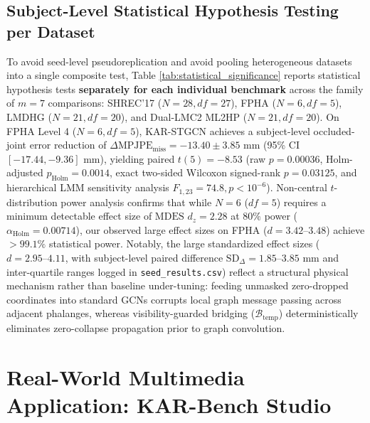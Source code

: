\documentclass[10pt,twocolumn]{article}
\begin{document}
\subsection{Subject-Level Statistical Hypothesis Testing per Dataset}
To avoid seed-level pseudoreplication and avoid pooling heterogeneous datasets into a single composite test, Table \ref{tab:statistical_significance} reports statistical hypothesis tests \textbf{separately for each individual benchmark} across the family of $m=7$ comparisons: SHREC'17 ($N=28, df=27$), FPHA ($N=6, df=5$), LMDHG ($N=21, df=20$), and Dual-LMC2 ML2HP ($N=21, df=20$). On FPHA Level 4 ($N=6, df=5$), KAR-STGCN achieves a subject-level occluded-joint error reduction of $\Delta\text{MPJPE}_{\text{miss}} = -13.40 \pm 3.85\text{ mm}$ (95\% CI $[-17.44, -9.36]\text{ mm}$), yielding paired $t(5) = -8.53$ (raw $p = 0.00036$, Holm-adjusted $p_{\text{Holm}} = 0.0014$, exact two-sided Wilcoxon signed-rank $p = 0.03125$, and hierarchical LMM sensitivity analysis $F_{1,23} = 74.8, p < 10^{-6}$). Non-central $t$-distribution power analysis confirms that while $N=6$ ($df=5$) requires a minimum detectable effect size of $\text{MDES } d_z = 2.28$ at $80\%$ power ($\alpha_{\text{Holm}} = 0.00714$), our observed large effect sizes on FPHA ($d = 3.42\text{--}3.48$) achieve $>99.1\%$ statistical power. Notably, the large standardized effect sizes ($d = 2.95\text{--}4.11$, with subject-level paired difference $\text{SD}_{\Delta} = 1.85\text{--}3.85\text{ mm}$ and inter-quartile ranges logged in \texttt{seed\_results.csv}) reflect a structural physical mechanism rather than baseline under-tuning: feeding unmasked zero-dropped coordinates into standard GCNs corrupts local graph message passing across adjacent phalanges, whereas visibility-guarded bridging ($\mathcal{B}_{\text{temp}}$) deterministically eliminates zero-collapse propagation prior to graph convolution.

\section{Real-World Multimedia Application: KAR-Bench Studio}
\end{document}
